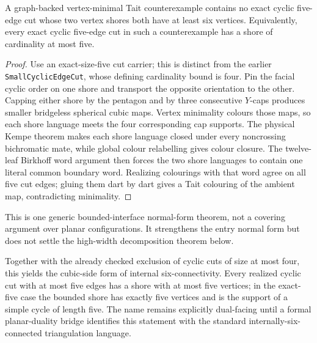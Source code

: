 \begin{theorem}
\label{thm:compositional-exact-five-cut}
A graph-backed vertex-minimal Tait counterexample contains no exact cyclic
five-edge cut whose two vertex shores both have at least six vertices.
Equivalently, every exact cyclic five-edge cut in such a counterexample has a
shore of cardinality at most five.
\end{theorem}

\begin{proof}
Use an exact-size-five cut carrier; this is distinct from the earlier
\texttt{SmallCyclicEdgeCut}, whose defining cardinality bound is four.  Pin the
facial cyclic order on one shore and transport the opposite orientation to the
other.  Capping either shore by the pentagon and by three consecutive $Y$-caps
produces smaller bridgeless spherical cubic maps.  Vertex minimality colours
those maps, so each shore language meets the four corresponding cap supports.
The physical Kempe theorem makes each shore language closed under every
noncrossing bichromatic mate, while global colour relabelling gives colour
closure.  The twelve-leaf Birkhoff word argument then forces the two shore
languages to contain one literal common boundary word.  Realizing colourings
with that word agree on all five cut edges; gluing them dart by dart gives a
Tait colouring of the ambient map, contradicting minimality.
\end{proof}

This is one generic bounded-interface normal-form theorem, not a covering
argument over planar configurations.  It strengthens the entry normal form but
does not settle the high-width decomposition theorem below.

Together with the already checked exclusion of cyclic cuts of size at most
four, this yields the cubic-side form of internal six-connectivity.  Every
realized cyclic cut with at most five edges has a shore with at most five
vertices; in the exact-five case the bounded shore has exactly five vertices
and is the support of a simple cycle of length five.  The name remains
explicitly dual-facing until a formal planar-duality bridge identifies this
statement with the standard internally-six-connected triangulation language.

